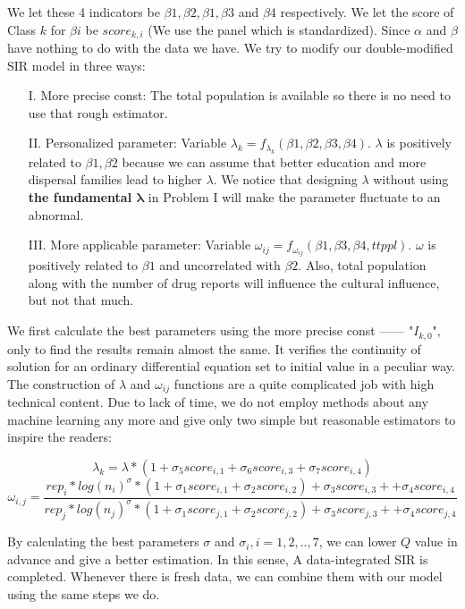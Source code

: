 \documentclass{mcmthesis}
\begin{document}
We let these 4 indicators be $\beta1,\beta2,\beta1,\beta3$ and $\beta4$ respectively. We let the score of Class $k$ for $\beta i$ be $score_{k,i}$ (We use the panel which is standardized). Since $\alpha$ and $\beta$ have nothing to do with the data we have. We try to modify our double-modified SIR model in three ways:
\begin{itemize}
	\item[I. ] More precise const: The total population is available so there is no need to use that rough estimator.
	\item[II. ] Personalized parameter: Variable $\lambda_k=f_{\lambda_k}(\beta1,\beta2,\beta3,\beta4)$. $\lambda$ is positively related to $\beta1,\beta2$ because we can assume that better education and more dispersal families lead to higher $\lambda$. We notice that designing $\lambda$ without using \textbf{the fundamental $\mathbf{\lambda}$ }in Problem I will make the parameter fluctuate to an abnormal.
	\item[III. ] More applicable parameter: Variable $\omega_{ij}=f_{\omega_{ij}}(\beta1,\beta3,\beta4,ttppl)$. $\omega$ is positively related to $\beta1$ and uncorrelated with $\beta 2$. Also, total population along with the number of drug reports will influence the cultural influence, but not that much.
\end{itemize}

We first calculate the best parameters using the more precise const —— "$I_{k,0}$", only to find the results remain almost the same. It verifies the continuity of solution for an ordinary differential equation set to initial value in a peculiar way. The construction of $\lambda$ and $\omega_{ij}$ functions are a quite complicated job with high technical content. Due to lack of time, we do not employ methods about any machine learning any more and give only two simple but reasonable estimators to inspire the readers:

$$\lambda_k=\lambda*(1+\sigma_5 score_{i,1}+\sigma_6 score_{i,3}+\sigma_7 score_{i,4})$$
$$\omega_{i,j}=\dfrac{rep_i*log(n_i)^{\sigma}*(1+\sigma_1 score_{i,1}+\sigma_2 score_{i,2})+\sigma_3 score_{i,3}++\sigma_4 score_{i,4}}{rep_j*log(n_j)^{\sigma}*(1+\sigma_1 score_{j,1}+\sigma_2 score_{j,2})+\sigma_3 score_{j,3}++\sigma_4 score_{j,4}}$$

By calculating the best parameters $\sigma$ and $\sigma_i, i=1,2,..,7$, we can lower $Q$ value in advance and give a better estimation. In this sense, A data-integrated SIR is completed. Whenever there is fresh data, we can combine them with our model using the same steps we do.
\end{document}
